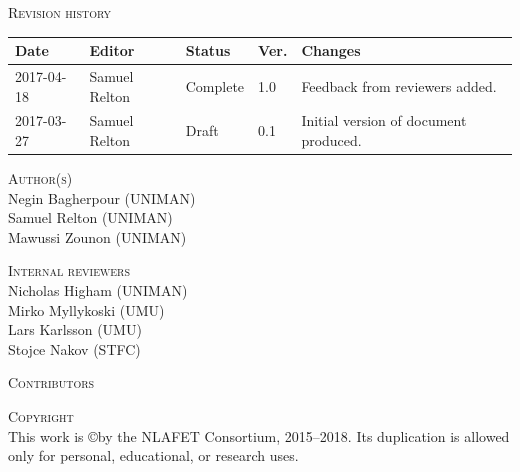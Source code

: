 \documentclass[a4paper,12pt]{article}
\begin{document}
\vspace{2em}




\noindent
\textsc{Revision history}\\[1em]
\begin{tabularx}{\linewidth}{@{}|l|l|l|l|X|}
  \hline
  \rowcolor{orange}
  \bf Date & \bf Editor & \bf Status & \bf Ver. & \bf Changes \\
  \hline
  2017-04-18 & Samuel Relton & Complete & 1.0 & Feedback from
                                                reviewers added.\\
  2017-03-27 & Samuel Relton & Draft & 0.1 & Initial version of
                                             document produced. \\
  \hline
\end{tabularx}

\vspace{2em}


\noindent
\textsc{Author(s)}\\[1em]
Negin Bagherpour (UNIMAN)\\
Samuel Relton (UNIMAN)\\
Mawussi Zounon (UNIMAN)

\vspace{2em}





\noindent
\textsc{Internal reviewers}\\[1em]
Nicholas Higham (UNIMAN)\\
Mirko Myllykoski (UMU)\\
Lars Karlsson (UMU)\\
Stojce Nakov (STFC)

\vspace{2em}






\noindent
\textsc{Contributors}\\[1em]

\vspace{2em}





\noindent
\textsc{Copyright}\\[1em]
This work is \copyright by the NLAFET Consortium, 2015--2018.
Its duplication is allowed only for personal, educational, or research uses.
\end{document}

